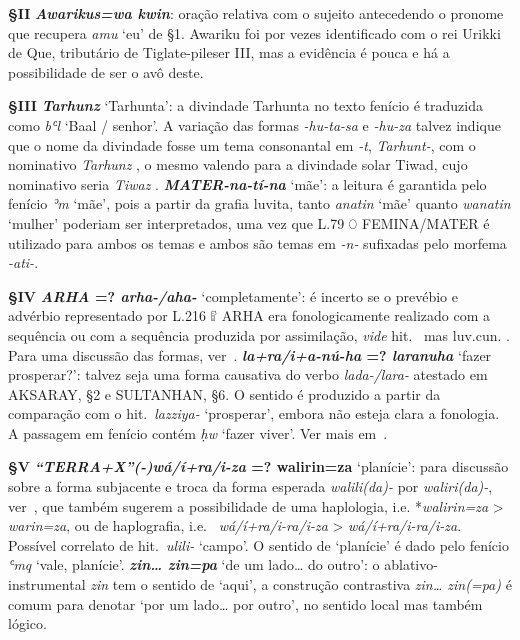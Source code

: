 \smallskip
\noindent\textbf{§II}\tabto{2em}
\textbf{\emph{Awarikus=wa kwin}}: oração relativa com o sujeito antecedendo o
pronome que recupera \emph{amu} `eu' de §1. Awariku foi por vezes
identificado com o rei Urikki de Que, tributário de Tiglate-pileser III\@,
mas a evidência é pouca e há a possibilidade de ser o avô deste.

\smallskip
\noindent\textbf{§III}\tabto{2em}
\textbf{\emph{Tarhunz}} `Tarhunta': a divindade Tarhunta no texto fenício é
traduzida como \emph{bʿl} `Baal \slash{} senhor'.
A variação das formas \emph{-hu-ta-sa} e
\emph{-hu-za} talvez indique que o nome da divindade fosse
um tema consonantal em \emph{-t}, \emph{Tarhunt-}, com o nominativo
\emph{Tarhunz} , o mesmo valendo para a divindade solar Tiwad,
cujo nominativo seria \emph{Tiwaz} .
\textbf{\emph{\emph{MATER}-na-tí-na}} `mãe': a leitura é garantida pelo fenício
\emph{ʾm} `mãe', pois a partir da grafia luvita, tanto \emph{anatin} `mãe'
quanto \emph{wanatin} `mulher' poderiam ser interpretados, uma vez que L.79 𔑘
FEMINA\slash{}MATER é utilizado para ambos os temas e ambos são temas em
\emph{-n-} sufixadas pelo morfema \emph{-ati-}.

\smallskip
\noindent\textbf{§IV}\tabto{2em}
\textbf{\emph{ARHA} {=?} \emph{arha-/aha-}} `completamente': é incerto se o
prevébio e advérbio representado por L.216 𔓸 ARHA era fonologicamente realizado
com a sequência  ou com a sequência  produzida por
assimilação, \emph{vide} hit.\ \emph{} mas luv.cun.
\emph{}. Para uma discussão das formas,
ver~\citet{Yakubovich2012}.
\textbf{\emph{la+ra/i+a-nú-ha} {=?} \emph{laranuha}} `fazer prosperar?': talvez
seja uma forma causativa do verbo \emph{lada-\slash{}lara-} atestado em
AKSARAY, §2 e SULTANHAN, §6. O sentido é produzido a partir da comparação com o
hit.\ \emph{lazziya-} `prosperar', embora não esteja clara a fonologia.
A passagem em fenício contém \emph{ḥw} `fazer viver'.
Ver mais em~\citet[104--5]{HawkinsMorpurgo1978}.

\smallskip
\noindent\textbf{§V}\tabto{2em}
\textbf{\emph{\emph{“TERRA+X”}{(-)}wá/í+ra/i-za} {=?} walirin=za} `planície':
para discussão sobre a forma subjacente e troca da forma esperada
\emph{walili{(da)}-} por \emph{waliri{(da)}-},
ver~\citet[106]{HawkinsMorpurgo1978}, que também sugerem a possibilidade de
uma haplologia, i.e. *\emph{walirin=za} >
\emph{warin=za}, ou de haplografia, i.e.\ 
\emph{wá/í+ra/i-ra/i-za} >  \emph{wá/í+ra/i-ra/i-za}.
Possível correlato de hit.\ \emph{ulili-} `campo'.
O sentido de `planície' é dado pelo fenício
\emph{ʿmq} `vale, planície'.
\textbf{\emph{zin\ldots{} zin=pa}} `de um lado\ldots{} do outro': o
ablativo-instrumental \emph{zin} tem o sentido de `aqui', a construção
contrastiva \emph{zin\ldots{} zin{(=pa)}} é comum para denotar `por um
lado\ldots{} por outro', no sentido local mas também lógico.


